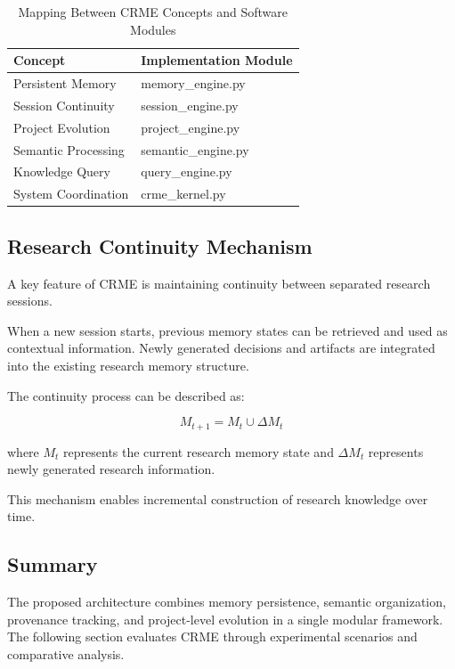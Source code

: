 \begin{table}[t]
\caption{Mapping Between CRME Concepts and Software Modules}
\label{tab:implementation_mapping}

\centering
\small

\begin{tabular}{p{}
                p{}}

\toprule
Concept &
Implementation Module
\\
\midrule

Persistent Memory &
memory\_engine.py
\\

Session Continuity &
session\_engine.py
\\

Project Evolution &
project\_engine.py
\\

Semantic Processing &
semantic\_engine.py
\\

Knowledge Query &
query\_engine.py
\\

System Coordination &
crme\_kernel.py
\\

\bottomrule

\end{tabular}

\end{table}



\subsection{Research Continuity Mechanism}

A key feature of CRME is maintaining continuity between separated
research sessions.

When a new session starts, previous memory states can be retrieved and
used as contextual information. Newly generated decisions and artifacts
are integrated into the existing research memory structure.

The continuity process can be described as:

\begin{equation}
M_{t+1}=M_t\cup\Delta M_t
\end{equation}

where $M_t$ represents the current research memory state and
$\Delta M_t$ represents newly generated research information.

This mechanism enables incremental construction of research knowledge
over time.



\subsection{Summary}

The proposed architecture combines memory persistence, semantic
organization, provenance tracking, and project-level evolution in a
single modular framework. The following section evaluates CRME through
experimental scenarios and comparative analysis.

